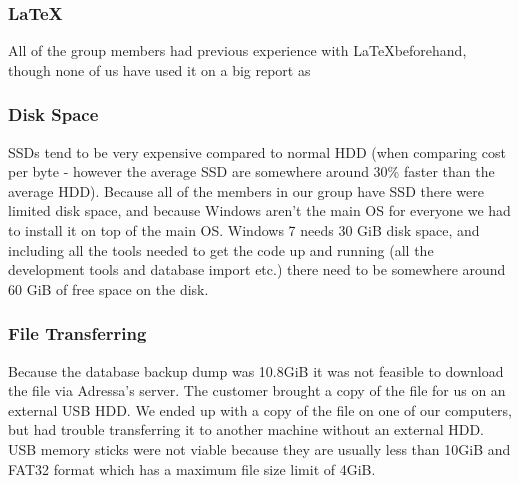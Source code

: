 \subsubsection{\LaTeX}
All of the group members had previous experience with \LaTeX beforehand, though none of us have used it on a big report as 


\subsubsection{Disk Space}
SSDs tend to be very expensive compared to normal HDD (when comparing cost per byte - however the average SSD are somewhere around 30\% faster than the average HDD). 
Because all of the members in our group have SSD there were limited disk space, and because Windows aren't the main OS for everyone we had to install it on top of the main OS. Windows 7 needs 30 GiB disk space, and including all the tools needed to get the code up and running (all the development tools and database import etc.) there need to be somewhere around 60 GiB of free space on the disk.

\subsubsection{File Transferring}
Because the database backup dump was 10.8GiB it was not feasible to download the file via Adressa's server. The customer brought a copy of the file for us on an external USB HDD. We ended up with a copy of the file on one of our computers, but had trouble transferring it to another machine without an external HDD. USB memory sticks were not viable because they are usually less than 10GiB and FAT32 format which has a maximum file size limit of 4GiB. 
